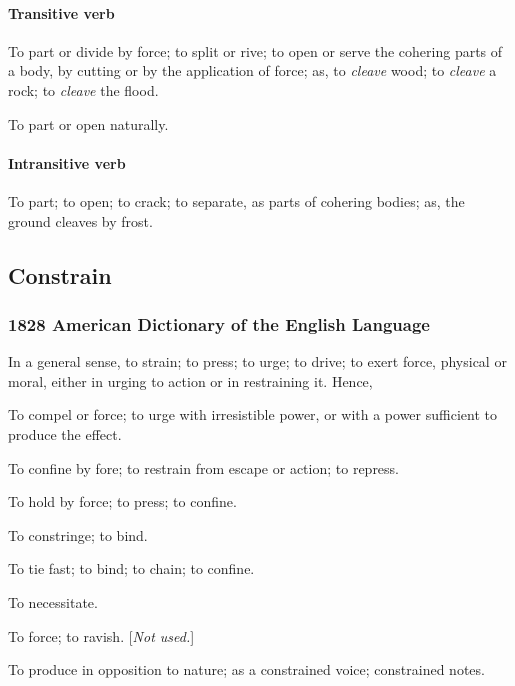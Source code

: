 			\paragraph{Transitive verb}
			
				\begin{compactitem}
					\item[1] To part or divide by force; to split or rive; to open or serve the cohering parts of a body, by cutting or by the application of force; as, to \textit{cleave} wood; to \textit{cleave} a rock; to \textit{cleave} the flood.
					\item[2] To part or open naturally.
				\end{compactitem}
				
			\paragraph{Intransitive verb}
			
				\begin{compactitem}
					\item To part; to open; to crack; to separate, as parts of cohering bodies; as, the ground cleaves by frost.
				\end{compactitem}
			
	\subsection{Constrain} %
		\label{CONSTRAIN}
		
		\subsubsection{1828 American Dictionary of the English Language}
		
			\begin{compactitem}
				\item In a general sense, to strain; to press; to urge; to drive; to exert force, physical or moral, either in urging to action or in restraining it. Hence,
				\item[1] To compel or force; to urge with irresistible power, or with a power sufficient to produce the effect.
				\item[2] To confine by fore; to restrain from escape or action; to repress.
				\item[3] To hold by force; to press; to confine.
				\item[4] To constringe; to bind.
				\item[5] To tie fast; to bind; to chain; to confine.
				\item[6] To necessitate.
				\item[7] To force; to ravish. [\textit{Not used.}]
				\item[8] To produce in opposition to nature; as a constrained voice; constrained notes.
			\end{compactitem}
			
